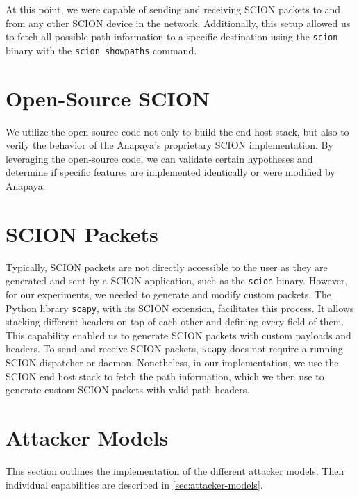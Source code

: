 At this point, we were capable of sending and receiving SCION packets to and from any other SCION device in the network.
Additionally, this setup allowed us to fetch all possible path information to a specific destination using the \texttt{scion} binary with the \texttt{scion showpaths} command.


\section{Open-Source SCION}
We utilize the open-source code not only to build the end host stack, but also to verify the behavior of the Anapaya's proprietary SCION implementation.
By leveraging the open-source code, we can validate certain hypotheses and determine if specific features are implemented identically or were modified by Anapaya.


\section{SCION Packets}
\label{sec:impl:SCIONpackets}
Typically, SCION packets are not directly accessible to the user as they are generated and sent by a SCION application, such as the \texttt{scion} binary.
However, for our experiments, we needed to generate and modify custom packets.
The Python library \texttt{scapy}, with its SCION extension, facilitates this process.
It allows stacking different headers on top of each other and defining every field of them.
This capability enabled us to generate SCION packets with custom payloads and headers.
To send and receive SCION packets, \texttt{scapy} does not require a running SCION dispatcher or daemon.
Nonetheless, in our implementation, we use the SCION end host stack to fetch the path information, which we then use to generate custom SCION packets with valid path headers.




\section{Attacker Models}
\label{sec:impl:attackerModel}

This section outlines the implementation of the different attacker models.
Their individual capabilities are described in \cref{sec:attacker-models}.

